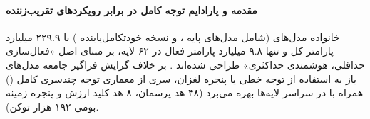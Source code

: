 \item {}

\paragraph*{مقدمه و پارادایم توجه کامل در برابر رویکردهای تقریب‌زننده}
خانواده مدل‌های  (شامل مدل‌های پایه ،  و نسخه خودتکامل‌یابنده ) با ۲۲۹.۹ میلیارد پارامتر کل و تنها ۹.۸ میلیارد پارامتر فعال در ۶۲ لایه، بر مبنای اصل «فعال‌سازی حداقلی، هوشمندی حداکثری» طراحی شده‌اند \cite{minimax2026m2}. بر خلاف گرایش فراگیر جامعه مدل‌های باز به استفاده از توجه خطی یا پنجره لغزان، سری  از معماری توجه چندسری کامل () همراه با  در سراسر لایه‌ها بهره می‌برد (۴۸ هد پرسمان، ۸ هد کلید-ارزش و پنجره زمینه بومی ۱۹۲ هزار توکن).

